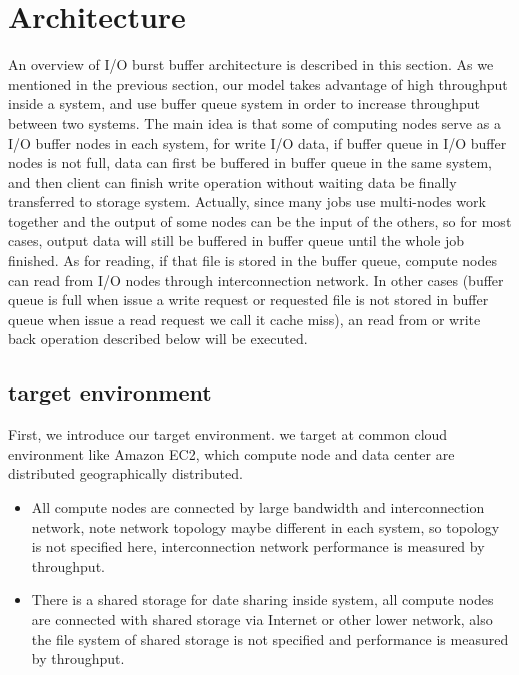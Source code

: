 \section{Architecture}
\label{sec:architecture}

An overview of I/O burst buffer architecture is described in this section.
As we mentioned in the previous section, our model takes advantage of high throughput inside a system, and use buffer queue system in order to increase throughput between two systems.
The main idea is that some of computing nodes serve as a I/O buffer nodes in each system, for write I/O data, if buffer queue in I/O buffer nodes is not full, data can first be buffered in buffer queue in the same system, and then client can finish write operation without waiting data be finally transferred to storage system.
Actually, since many jobs use multi-nodes work together and the output of some nodes can be the input of the others, so for most cases, output data will still be buffered in buffer queue until the whole job finished.
As for reading, if that file is stored in the buffer queue, compute nodes can read from I/O nodes through interconnection network.
In other cases (buffer queue is full when issue a write request or requested file is not stored in buffer queue when issue a read request we call it cache miss), an read from or write back operation described below will be executed. 

\subsection{target environment}
First, we introduce our target environment.
we target at common cloud environment like Amazon EC2, which compute node and data center are distributed geographically distributed.

\begin{itemize}
	\item All compute nodes are connected by large bandwidth and interconnection network, note network topology maybe different in each system, so topology is not specified here, interconnection network performance is measured by throughput.
	\item There is a shared storage for date sharing inside system, all compute nodes are connected with shared storage via Internet or other lower network, also the file system of shared storage is not specified and performance is measured by throughput.
\end{itemize}

